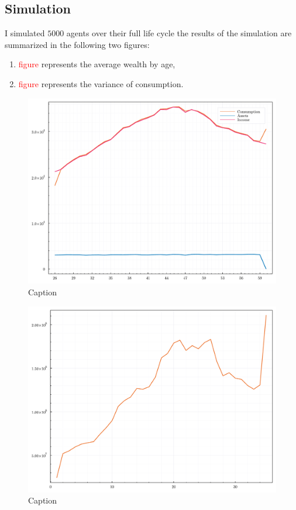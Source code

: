 \documentclass[12pt]{article}
\begin{document}
\subsection{Simulation}

I simulated $5000$ agents over their full life cycle the results of the simulation are summarized in the following two figures:
\begin{enumerate}
    \item \textcolor{red}{figure} represents the average wealth by age,
    \item \textcolor{red}{figure} represents the variance of consumption.
\end{enumerate}

\begin{figure}[h*]
    \centering
    \includegraphics[scale = .5]{04 - 2022 Fall/Econ 810 Advanded Macroeconomic Theory/Part 1/PS 1/document/figures/average_value_of_wealth_by_age.pdf}
    \caption{Caption}
    \label{fig:my_label}
\end{figure}

\begin{figure}[h*]
    \centering
    \includegraphics[scale = .5]{04 - 2022 Fall/Econ 810 Advanded Macroeconomic Theory/Part 1/PS 1/document/figures/variance_of_consumption_by_age.pdf}
    \caption{Caption}
    \label{fig:my_label}
\end{figure}





\end{document}
